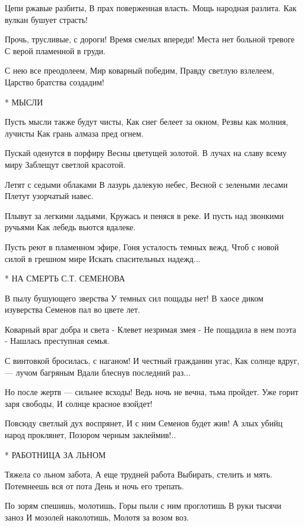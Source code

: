Цепи ржавые разбиты,
В прах поверженная власть.
Мощь народная разлита.
Как вулкан бушует страсть!

Прочь, трусливые, с дороги!
Время смелых впереди!
Места нет больной тревоге
С верой пламенной в груди.

С нею все преодолеем,
Мир коварный победим,
Правду светлую взлелеем,
Царство братства создадим!


* МЫСЛИ

Пусть мысли также будут чисты,
          Как снег белеет за окном,
Резвы как молния, лучисты
          Как грань алмаза пред огнем.

Пускай оденутся в порфиру
          Весны цветущей золотой.
В лучах на славу всему миру
          Заблещут светлой красотой.

Летят с седыми облаками
          В лазурь далекую небес,
Весной с зелеными лесами
          Плетут узорчатый навес.

Плывут за легкими ладьями,
          Кружась и пеняся в реке.
И пусть над звонкими ручьями
          Как лебедь вьются вдалеке.

Пусть реют в пламенном эфире,
          Гоня усталость темных вежд,
Чтоб с новой силой в грешном мире
          Искать спасительных надежд...


* НА СМЕРТЬ С.Т. СЕМЕНОВА

В пылу бушующего зверства
     У темных сил пощады нет!
В хаосе диком изуверства
     Семенов пал во цвете лет.

Коварный враг добра и света -
     Клевет незримая змея -
Не пощадила в нем поэта -
     Нашлась преступная семья.

С винтовкой бросилась, с наганом!
И честный гражданин угас,
Как солнце вдруг, — лучом багряным
Вдали блеснув последний раз...

Но после жертв — сильнее всходы!
Ведь ночь не вечна, тьма пройдет.
Уже горит заря свободы,
И солнце красное взойдет!

Повсюду светлый дух воспрянет,
И с ним Семенов будет жив!
А злых убийц народ проклянет,
Позором черным заклеймив!..


* РАБОТНИЦА ЗА ЛЬНОМ

Тяжела со льном забота,
А еще трудней работа
          Выбирать, стелить и мять.
Потемнеешь вся от пота
          День и ночь его трепать.

По зорям спешишь, молотишь,
Горы пыли с ним проглотишь
          В руки тысячи заноз
И мозолей наколотишь,
          Молотя за возом воз.

